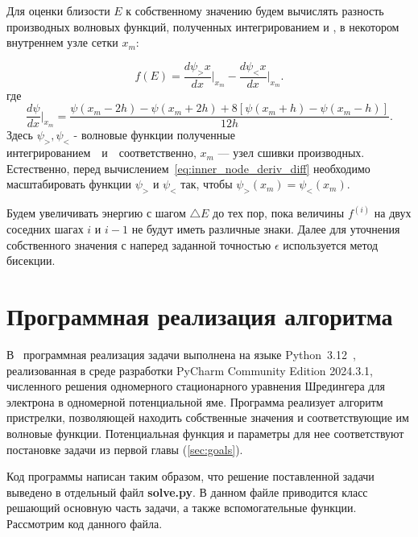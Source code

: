 \documentclass[a4paper,12pt]{article}
\begin{document}
Для оценки близости $E$ к собственному значению будем вычислять разность производных волновых функций, полученных интегрированием \guillemetright и \guillemetright, в некотором внутреннем узле сетки $x_m$:

\begin{equation}
    f(E) = \frac{d\psi_>x}{dx}\bigg|_{x_m} - \frac{d\psi_<x}{dx}\bigg|_{x_m}.
    \label{eq:inner_node_deriv_diff}
\end{equation}
где
\begin{equation}
    \frac{d\psi}{dx}\bigg|_{x_m} =\frac{\psi(x_m-2h) - \psi(x_m+2h) + 8\left[ \psi(x_m + h) - \psi(x_m - h) \right]}{12h}.
    \label{eq:inner_node_deriv_diff_expl}
\end{equation}
Здесь $\psi_>, \psi_<$ - волновые функции полученные интегрированием~\guillemetright~и~\guillemetright~соответственно, $x_m$ --- узел сшивки производных.
Естественно, перед вычислением~\eqref{eq:inner_node_deriv_diff} необходимо масштабировать функции $\psi_>$ и $\psi_<$ так, чтобы $\psi_>(x_m)=\psi_<(x_m)$.

Будем увеличивать энергию с шагом $\triangle E$ до тех пор, пока величины $f^{(i)}$ на двух соседних шагах $i$ и $i - 1$ не будут иметь различные знаки.
Далее для уточнения собственного значения с наперед заданной точностью $\epsilon$ используется метод бисекции.

\newpage

\section{Программная реализация алгоритма}\label{sec:--}


В~ программная реализация задачи выполнена на языке Python~3.12~\cite{python}, реализованная в среде разработки PyCharm Community Edition 2024.3.1, численного решения одномерного стационарного уравнения Шредингера для электрона в одномерной потенциальной яме.
Программа реализует алгоритм пристрелки, позволяющей находить собственные значения и соответствующие им волновые функции.
Потенциальная функция и параметры для нее соответствуют постановке задачи из первой главы (\ref{sec:goals}).


Код программы написан таким образом, что решение поставленной задачи выведено в отдельный файл \textbf{solve.py}.
В данном файле приводится класс решающий основную часть задачи, а также вспомогательные функции.
Рассмотрим код данного файла.
\end{document}
